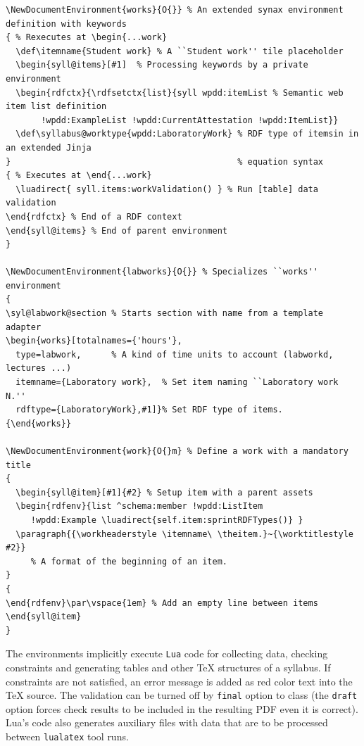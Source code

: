 \documentclass[
]{ceurart}
\begin{document}
\begin{verbatim}
\NewDocumentEnvironment{works}{O{}} % An extended synax environment definition with keywords
{ % Rexecutes at \begin{...work}
  \def\itemname{Student work} % A ``Student work'' tile placeholder
  \begin{syll@items}[#1]  % Processing keywords by a private environment
  \begin{rdfctx}{\rdfsetctx{list}{syll wpdd:itemList % Semantic web item list definition
       !wpdd:ExampleList !wpdd:CurrentAttestation !wpdd:ItemList}}
  \def\syllabus@worktype{wpdd:LaboratoryWork} % RDF type of itemsin in an extended Jinja
}                                             % equation syntax
{ % Executes at \end{...work}
  \luadirect{ syll.items:workValidation() } % Run [table] data validation
\end{rdfctx} % End of a RDF context
\end{syll@items} % End of parent environment
}

\NewDocumentEnvironment{labworks}{O{}} % Specializes ``works'' environment
{
\syl@labwork@section % Starts section with name from a template adapter
\begin{works}[totalnames={'hours'},
  type=labwork,      % A kind of time units to account (labworkd, lectures ...)
  itemname={Laboratory work},  % Set item naming ``Laboratory work N.''
  rdftype={LaboratoryWork},#1]}% Set RDF type of items.
{\end{works}}

\NewDocumentEnvironment{work}{O{}m} % Define a work with a mandatory title
{
  \begin{syll@item}[#1]{#2} % Setup item with a parent assets
  \begin{rdfenv}{list ^schema:member !wpdd:ListItem
     !wpdd:Example \luadirect{self.item:sprintRDFTypes()} }
  \paragraph{{\workheaderstyle \itemname\ \theitem.}~{\worktitlestyle #2}}
     % A format of the beginning of an item.
}
{
\end{rdfenv}\par\vspace{1em} % Add an empty line between items
\end{syll@item}
}
\end{verbatim}

The environments implicitly execute \verb|Lua| code for collecting data, checking constraints and generating tables and other \TeX{} structures of a syllabus.  If constraints are not satisfied, an error message is added as red color text into the \TeX{} source.   The validation can be turned off by \verb|final| option to class (the \verb|draft| option forces check results to be included in the resulting PDF even it is correct).  Lua's code also generates auxiliary files with data that are to be processed between \verb|lualatex| tool runs.
\end{document}
